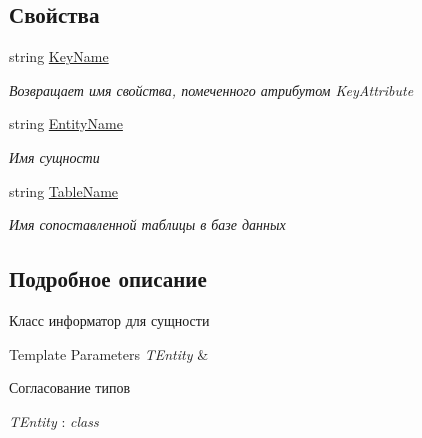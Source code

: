 \subsection*{Свойства}
\begin{DoxyCompactItemize}
\item 
string \hyperlink{class_security_1_1_entity_dal_1_1_infrastructure_1_1_entity_info_a33cdc95217b297c5270b71baec8e71d3}{Key\+Name}
\begin{DoxyCompactList}\small\item\em Возвращает имя свойства, помеченного атрибутом Key\+Attribute \end{DoxyCompactList}\item 
string \hyperlink{class_security_1_1_entity_dal_1_1_infrastructure_1_1_entity_info_ab325cd6803fd1ed5f5e57792b83ca098}{Entity\+Name}
\begin{DoxyCompactList}\small\item\em Имя сущности \end{DoxyCompactList}\item 
string \hyperlink{class_security_1_1_entity_dal_1_1_infrastructure_1_1_entity_info_aa6fea198687d571bb309a59771aab2be}{Table\+Name}
\begin{DoxyCompactList}\small\item\em Имя сопоставленной таблицы в базе данных \end{DoxyCompactList}\end{DoxyCompactItemize}


\subsection{Подробное описание}
Класс информатор для сущности 


\begin{DoxyTemplParams}{Template Parameters}
{\em T\+Entity} & \\
\hline
\end{DoxyTemplParams}
\begin{Desc}
\item[Согласование типов]\begin{description}
\item[{\em T\+Entity} : {\em class}]\end{description}
\end{Desc}


